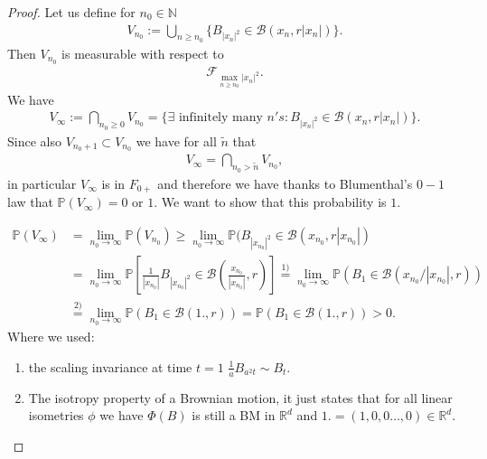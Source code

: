 \documentclass[../mainfile.tex]{subfiles}
\begin{document}
\begin{proof}
Let us define for $n_0 \in \mathbb{N}$ 
\begin{align*}
V_{n_0} := \bigcup_{n \geq n_0} \{ B_{|x_n|^2} \in \mathcal{B}(x_n, r|x_n|) \rbrace.
\end{align*}
Then $V_{n_0}$ is measurable with respect to
\begin{align*}
\mathcal{F}_{ \max_{n \geq n_0}|x_n|^2}. 
\end{align*}
We have
\begin{align*}
V_\infty := \bigcap_{n_0 \geq 0} V_{n_0} = \{ \exists \text{ infinitely many } n's : B_{|x_n|^2} \in \mathcal{B}(x_n,r|x_n|) \rbrace.
\end{align*}
Since also $V_{n_0+1} \subset V_{n_0}$ we have for all $\tilde{n}$ that 
\begin{align*}
V_\infty = \bigcap_{n_0 > \tilde{n}} V_{n_0},
\end{align*}
in particular $V_\infty$ is in $F_{0+}$ and therefore we have thanks to Blumenthal's $0-1$ law that $\mathbb{P}(V_\infty)=0$ or $1$. We want to show that this probability is $1$. 

\begin{align*}
\mathbb{P}(V_\infty)&= \lim_{n_0 \to \infty} \mathbb{P}(V_{n_0}) \geq \lim_{n_0 \to \infty} \mathbb{P}( B_{|x_{n_0}|^2} \in \mathcal{B}( x_{n_0},  r|x_{n_0}| )  \\ &= \lim_{n_0 \to \infty} \mathbb{P} \left[ \frac{1}{|x_{n_0}|} B_{|x_{n_0}|^2}  \in \mathcal{B}\left( \frac{x_{n_0}}{|x_{n_0}|}, r \right) \right] \overset{1)}=  \lim_{n_0 \to \infty} \mathbb{P}(B_1 \in \mathcal{B}(x_{n_0}/|x_{n_0}| , r ) )  \\
&\overset{2)} = \lim_{n_0 \to \infty}\mathbb{P}(B_1 \in \mathcal{B}(1.,r)) = \mathbb{P}(B_1 \in \mathcal{B}(1.,r)) >0.
\end{align*}
Where we used:
\begin{enumerate}
\item the scaling invariance at time $t=1$ $\frac{1}{a}B_{a^2t} \sim B_t$.
\item The isotropy property of a Brownian motion,  it just states that for all linear isometries $\phi$ we have $\Phi(B)$ is still a BM in $\mathbb{R}^d$ and $1.=(1,0,0 \dots ,0)\in \mathbb{R}^d$. 
\end{enumerate}
\end{proof}
\end{document}
